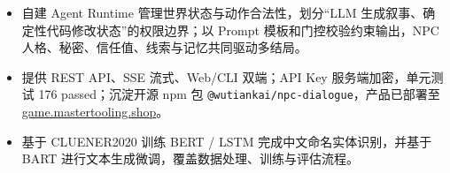 \begin{itemize}
  \item 自建 Agent Runtime 管理世界状态与动作合法性，划分“LLM 生成叙事、确定性代码修改状态”的权限边界；以 Prompt 模板和门控校验约束输出，NPC 人格、秘密、信任值、线索与记忆共同驱动多结局。
  \item 提供 REST API、SSE 流式、Web/CLI 双端；API Key 服务端加密，单元测试 176 passed；沉淀开源 npm 包 \texttt{@wutiankai/npc-dialogue}，产品已部署至 \href{https://game.mastertooling.shop}{game.mastertooling.shop}。
\end{itemize}

\begin{itemize}
  \item 基于 CLUENER2020 训练 BERT / LSTM 完成中文命名实体识别，并基于 BART 进行文本生成微调，覆盖数据处理、训练与评估流程。
\end{itemize}

